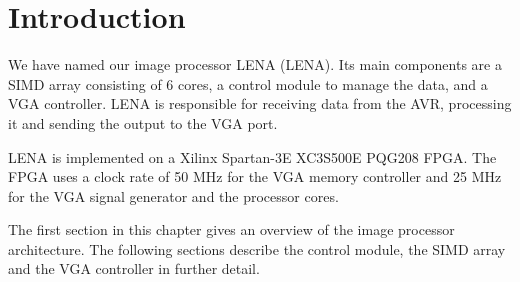 \section{Introduction}

We have named our image processor \acs{LENA} (\acl{LENA}). Its main
components are a \ac{SIMD} array consisting of 6 cores, a control module
to manage the data, and a \ac{VGA} controller. \ac{LENA} is responsible
for receiving data from the AVR, processing it and sending the output to
the \ac{VGA} port.

LENA is implemented on a Xilinx Spartan-3E XC3S500E PQG208 FPGA. The
FPGA uses a clock rate of 50 MHz for the VGA memory controller and 25
MHz for the VGA signal generator and the processor cores.

The first section in this chapter gives an overview of the image
processor architecture. The following sections describe the control
module, the SIMD array and the VGA controller in further detail.
